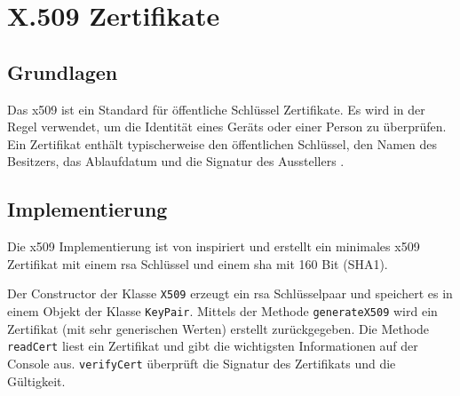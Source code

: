 \chapter{X.509 Zertifikate}

\section{Grundlagen}
Das \gls{x509} ist ein Standard für öffentliche Schlüssel Zertifikate. Es wird in der Regel verwendet, um die Identität eines Geräts oder einer Person zu überprüfen. Ein Zertifikat enthält typischerweise den öffentlichen Schlüssel, den Namen des Besitzers, das Ablaufdatum und die Signatur des Ausstellers \cite{ITU2011}.

\section{Implementierung}
Die \gls{x509} Implementierung ist von \cite{bouncy01} inspiriert und erstellt ein minimales \gls{x509} Zertifikat mit einem \gls{rsa} Schlüssel und einem \gls{sha} mit 160 Bit (SHA1).

Der Constructor der Klasse \texttt{X509} erzeugt ein \gls{rsa} Schlüsselpaar und speichert es in einem Objekt der Klasse \texttt{KeyPair}.
Mittels der Methode \texttt{generateX509} wird ein Zertifikat (mit sehr generischen Werten) erstellt zurückgegeben.
Die Methode \texttt{readCert} liest ein Zertifikat und gibt die wichtigsten Informationen auf der Console aus.
\texttt{verifyCert} überprüft die Signatur des Zertifikats und die Gültigkeit.
